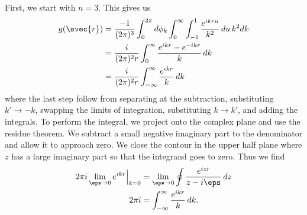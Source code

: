 \documentclass[aps,prl,reprint]{revtex4-1}
\begin{document}
First, we start with \(n=3\).  This gives us
\begin{align*}
    g(\svec{r}) &= \frac{-1}{(2\pi)^3} \int_0^{2\pi}d\phi_k
    \int_0^\infty \int_{-1}^1 \frac{e^{ikru}}{k^2} \,du \,k^2 dk \\
    &= \frac{i}{(2\pi)^2r}
    \int_0^\infty \frac{e^{ikr} -e^{-ikr}}{k} \,dk \\
    &= \frac{i}{(2\pi)^2r} \int_{-\infty}^\infty \frac{e^{ikr}}{k} \,dk
\end{align*}
where the last step follow from separating at the subtraction,
substituting \(k' \to -k\), swapping the limits of integration,
substituting \(k \to k'\), and adding the integrals.  To perform the
integral, we project onto the complex plane and use the residue
theorem.  We subtract a small negative imaginary part to the denominator
and allow it to approach zero.  We close the contour in the upper half
plane where \(z\) has a large imaginary part so that the integrand goes
to zero.  Thus we find
\begin{align*}
    2\pi i \lim_{\eps\to0} e^{ikr} \Big\rvert_{k=0} &= \lim_{\eps\to0}
    \oint \frac{e^{izr}}{z-i\eps} \,dz \\
    2\pi i&= \int_{-\infty}^\infty \frac{e^{ikr}}{k} \,dk.
\end{align*}


\end{document}
